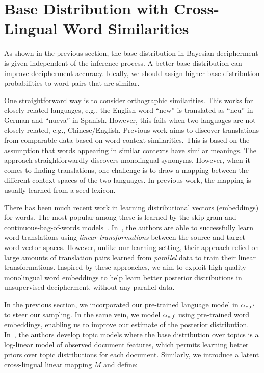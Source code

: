 \section{Base Distribution with Cross-Lingual Word Similarities} \label{sec:theory}

As shown in the previous section, the base distribution in Bayesian decipherment is given independent of the inference process. 
A better base distribution can improve decipherment accuracy. Ideally, we should assign higher base distribution probabilities to word pairs that are similar.

One straightforward way is to consider orthographic similarities. This works for closely related languages, e.g., the English word ``new'' is translated as ``neu'' in German and ``nueva'' in Spanish. However, this fails when two languages are not closely related, e.g., Chinese/English. Previous work aims to discover translations from comparable data based on word context similarities. This is based on the assumption that words appearing in similar contexts have similar meanings. The approach straightforwardly discovers monolingual synonyms. However, when it comes to finding translations, one challenge is to draw a mapping between the different context spaces of the two languages. In previous work, the mapping is usually learned from a seed lexicon.

There has been much recent work in learning distributional vectors (embeddings) for words. The most popular among these is learned by the skip-gram and continuous-bag-of-words models~\cite{mikolov2013efficient}. In~, the authors are  able to successfully learn word translations using {\em linear transformations} between the source and target word vector-spaces. However, unlike our learning setting, their approach relied on large amounts of translation pairs learned from \emph{parallel} data to train their linear transformations. Inspired by these approaches, we aim to exploit high-quality monolingual word embeddings to help learn better posterior distributions in unsupervised decipherment, without any parallel data.

In the previous section, we incorporated our pre-trained language model in $\alpha_{e,e'}$ to steer our sampling. In the same vein, we model $\alpha_{e,f}$ using pre-trained word embeddings, enabling us to improve our estimate of the posterior distribution. In~, the authors develop topic models where the base distribution over topics is a log-linear model of observed document features, which permits learning better priors over topic distributions for each document. Similarly, we introduce a latent cross-lingual linear mapping $M$ and define:

